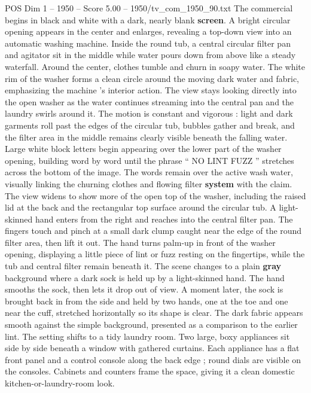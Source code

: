 \begin{textsample}{POS Dim 1 – 1950 – Score 5.00 – 1950/tv\_com\_1950\_90.txt}  \label{ex:f1_pos_087}
The commercial begins in black and white with a dark, nearly blank \textbf{screen}.
A bright circular opening appears in the center and enlarges, revealing a top-down view into an automatic washing machine.
Inside the round tub, a central circular filter pan and agitator sit in the middle while water pours down from above like a steady waterfall.
Around the center, clothes tumble and churn in soapy water.
The white rim of the washer forms a clean circle around the moving dark water and fabric, emphasizing the machine ’s interior action.
The view stays looking directly into the open washer as the water continues streaming into the central pan and the laundry swirls around it.
The motion is constant and vigorous : light and dark garments roll past the edges of the circular tub, bubbles gather and break, and the filter area in the middle remains clearly visible beneath the falling water.
Large white block letters begin appearing over the lower part of the washer opening, building word by word until the phrase “ NO LINT FUZZ ” stretches across the bottom of the image.
The words remain over the active wash water, visually linking the churning clothes and flowing filter \textbf{system} with the claim.
The view widens to show more of the open top of the washer, including the raised lid at the back and the rectangular top surface around the circular tub.
A light-skinned hand enters from the right and reaches into the central filter pan.
The fingers touch and pinch at a small dark clump caught near the edge of the round filter area, then lift it out.
The hand turns palm-up in front of the washer opening, displaying a little piece of lint or fuzz resting on the fingertips, while the tub and central filter remain beneath it.
The scene changes to a plain \textbf{gray} background where a dark sock is held up by a light-skinned hand.
The hand smooths the sock, then lets it drop out of view.
A moment later, the sock is brought back in from the side and held by two hands, one at the toe and one near the cuff, stretched horizontally so its shape is clear.
The dark fabric appears smooth against the simple background, presented as a comparison to the earlier lint.
The setting shifts to a tidy laundry room.
Two large, boxy appliances sit side by side beneath a window with gathered curtains.
Each appliance has a flat front panel and a control console along the back edge ; round dials are visible on the consoles.
Cabinets and counters frame the space, giving it a clean domestic kitchen-or-laundry-room look.

\end{textsample}
